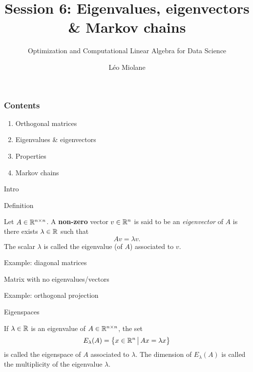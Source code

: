 \documentclass{beamer}
\title{Session 6: Eigenvalues, eigenvectors \& Markov chains}
\subtitle{Optimization and Computational Linear Algebra for Data Science}
\author{Léo Miolane}
\date{}
\begin{document}
\setcounter{showProgressBar}{0}
\setcounter{showSlideNumbers}{0}

\frame{\titlepage}

\begin{frame}
	\frametitle{Contents}
	\begin{enumerate}
		\item Orthogonal matrices
		\item Eigenvalues \& eigenvectors
		\item Properties
		\item Markov chains
	\end{enumerate}
\end{frame}


\setcounter{framenumber}{0}
\setcounter{showSlideNumbers}{1}

\begin{frame}[t]{Intro}
	\grid

\end{frame}

\begin{frame}[t]{Definition}
	\grid

	\vspace{-0.4cm}
	\begin{definition}\label{def:eigen}
		Let $A \in \mathbb{R}^{n \times n}$. A \textbf{non-zero} vector $v \in \mathbb{R}^n$ is said to be an \emph{eigenvector} of $A$ is there exists $\lambda \in \mathbb{R}$ such that
		$$
		A v = \lambda v.
		$$
		The scalar $\lambda$ is called the eigenvalue (of $A$) associated to $v$. 
	\end{definition}
\end{frame}

\begin{frame}[t]{Example: diagonal matrices}
	\grid

\end{frame}
\begin{frame}[t]{Matrix with no eigenvalues/vectors}
	\grid

\end{frame}
\begin{frame}[t]{Example: orthogonal projection}
	\grid

\end{frame}

\begin{frame}[t]{Eigenspaces}
	\grid

	\vspace{-0.4cm}
	\begin{definition}
		If $\lambda \in \mathbb{R}$ is an eigenvalue of $A \in \mathbb{R}^{n \times n}$, the set
		$$
		E_{\lambda}(A) = \big\{ x \in \mathbb{R}^n \, \big| \, Ax = \lambda x \big\}
		$$
		is called the eigenspace of $A$ associated to $\lambda$. The dimension of $E_{\lambda}(A)$ is called the multiplicity of the eigenvalue $\lambda$.
	\end{definition}
\end{frame}
\end{document}
